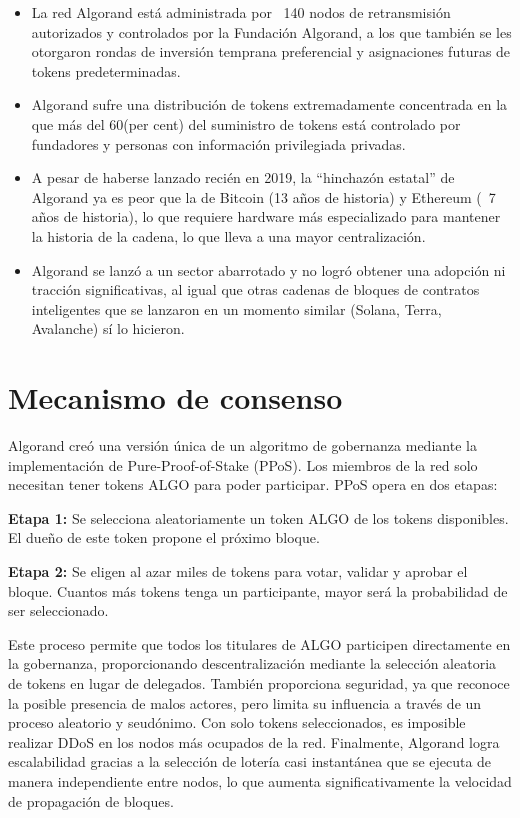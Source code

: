 \documentclass{article}
\begin{document}
\begin{itemize}
    \item La red Algorand está administrada por ~140 nodos de retransmisión autorizados y controlados por la Fundación Algorand, a los que también se les otorgaron rondas de inversión temprana preferencial y asignaciones futuras de tokens predeterminadas.
    \item Algorand sufre una distribución de tokens extremadamente concentrada en la que más del 60(per cent) del suministro de tokens está controlado por fundadores y personas con información privilegiada privadas.
    \item A pesar de haberse lanzado recién en 2019, la “hinchazón estatal” de Algorand ya es peor que la de Bitcoin (13 años de historia) y Ethereum (~7 años de historia), lo que requiere hardware más especializado para mantener la historia de la cadena, lo que lleva a una mayor centralización.
    \item Algorand se lanzó a un sector abarrotado y no logró obtener una adopción ni tracción significativas, al igual que otras cadenas de bloques de contratos inteligentes que se lanzaron en un momento similar (Solana, Terra, Avalanche) sí lo hicieron.
\end{itemize}



\section{Mecanismo de consenso}

Algorand creó una versión única de un algoritmo de gobernanza mediante la implementación de Pure-Proof-of-Stake (PPoS). Los miembros de la red solo necesitan tener tokens ALGO para poder participar. PPoS opera en dos etapas:

\textbf{Etapa 1:} Se selecciona aleatoriamente un token ALGO de los tokens disponibles. El dueño de este token propone el próximo bloque.

\textbf{Etapa 2:} Se eligen al azar miles de tokens para votar, validar y aprobar el bloque. Cuantos más tokens tenga un participante, mayor será la probabilidad de ser seleccionado.

Este proceso permite que todos los titulares de ALGO participen directamente en la gobernanza, proporcionando descentralización mediante la selección aleatoria de tokens en lugar de delegados. También proporciona seguridad, ya que reconoce la posible presencia de malos actores, pero limita su influencia a través de un proceso aleatorio y seudónimo. Con solo tokens seleccionados, es imposible realizar DDoS en los nodos más ocupados de la red. Finalmente, Algorand logra escalabilidad gracias a la selección de lotería casi instantánea que se ejecuta de manera independiente entre nodos, lo que aumenta significativamente la velocidad de propagación de bloques.
\end{document}
